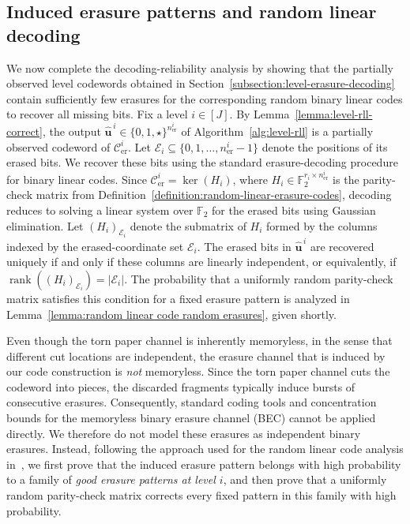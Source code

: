 \documentclass[journal,letterpaper,onecolumn,11pt]{IEEEtran}
\newcommand{\cC}{\mathcal{C}}
\newcommand{\cE}{\mathcal{E}}
\newcommand{\boldu}{\mathbf{u}}
\newcommand{\rank}{\operatorname{rank}}
\begin{document}
\subsection{Induced erasure patterns and random linear decoding}
\label{subsection:erasure-reliability}
We now complete the decoding-reliability analysis by showing that the partially observed level codewords obtained in Section~\ref{subsection:level-erasure-decoding} contain sufficiently few erasures for the corresponding random binary linear codes to recover all missing bits. 
Fix a level \(i\in[J]\).  By
Lemma~\ref{lemma:level-rll-correct}, the output
\(\widehat{\boldu}^{\,i}\in\{0,1,\star\}^{n_{\mathrm{er}}^i}\) of
Algorithm~\ref{alg:level-rll} is a partially observed codeword of
\(\cC_{\mathrm{er}}^i\).  
Let
\(\cE_i\subseteq\{0,1,\ldots,n_{\mathrm{er}}^i-1\}\) denote the positions
of its erased bits. 
 We recover these bits using the standard
erasure-decoding procedure for binary linear codes.  Since
\(\cC_{\mathrm{er}}^i=\ker(H_i)\), where
\(H_i\in\mathbb F_2^{r_i\times n_{\mathrm{er}}^i}\) is the parity-check
matrix from Definition~\ref{definition:random-linear-erasure-codes},
decoding reduces to solving a linear system over \(\mathbb F_2\) for the
erased bits using Gaussian elimination.
Let \((H_i)_{\cE_i}\) denote the submatrix of \(H_i\) formed by the
columns indexed by the erased-coordinate set \(\cE_i\).  The erased bits
in \(\widehat{\boldu}^{\,i}\) are recovered uniquely if and only if these
columns are linearly independent, or equivalently, if
\(\rank((H_i)_{\cE_i})=|\cE_i|\).  The probability that a uniformly
random parity-check matrix satisfies this condition for a fixed erasure
pattern is analyzed in
Lemma~\ref{lemma:random linear code random erasures}, given shortly.

Even though the torn paper channel is inherently memoryless, in the sense that different cut locations are independent, the erasure channel that is induced by our code construction is \emph{not} memoryless.
Since the torn paper channel cuts the codeword into pieces, the discarded fragments typically
induce bursts of consecutive erasures. 
Consequently, standard coding tools and concentration bounds for the
memoryless binary erasure channel (BEC) cannot be applied directly. 
We therefore do not model these erasures as independent binary erasures. Instead, following the approach used for the random linear code analysis in~\cite{liu2026improved}, we first prove that the induced erasure pattern belongs with high probability to a family of \textit{good erasure patterns at level $i$}, and then prove that a uniformly random parity-check matrix corrects every fixed pattern in this family with high probability.
\end{document}
